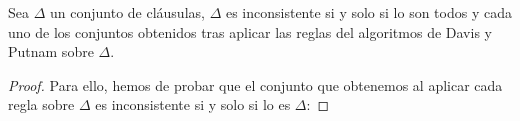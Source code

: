  \begin{teo}\label{teo:func_davis_putnam}
     Sea $\Delta$ un conjunto de cláusulas, $\Delta$ es inconsistente si y solo si lo son todos y cada uno de los conjuntos obtenidos tras aplicar las reglas del algoritmos de Davis y Putnam sobre $\Delta$.
     \begin{proof}
         Para ello, hemos de probar que el conjunto que obtenemos al aplicar cada regla sobre $\Delta$ es inconsistente si y solo si lo es $\Delta$:
         \begin{comment}
         \begin{itemize}
             \item \underline{Regla 1.} En este caso, basta ver que si $\Delta\cup\{\alpha\}$ es un conjunto de cláusulas de forma que $\alpha$ es una tautología, entonces $\Delta\cup\{\alpha\}$ es inconsistente si y solo si lo es $\Delta$. Para ello, supongamos que $\Delta = \{\varphi_1,\ldots,\varphi_n\}$:

                 $\Delta\cup\{\alpha\}$ es inconsistente si y solo si lo es $\{\varphi_1\land\ldots\land\varphi_n\land \alpha\}$, que es inconsistente si y solo si para cualquier interpretación $I$ se tiene que:
                 \begin{equation*}
                     \left(\prod_{k=1}^{n}I(\varphi_k)\right)I(\alpha) = 0
                 \end{equation*}
                 Que es equivalente a que $\prod\limits_{k=1}^{n}I(\varphi_k)=0$, ya que $\alpha$ es una tautología, por lo que $I(\alpha)=1$ para cualquier interpretación $I$. Esta última condición es equivalente con que $\{\varphi_1\land\ldots\land\varphi_k\}$ sea inconsistente, si y solo si lo es $\Delta$.


\end{comment}
\end{proof}
\end{teo}
